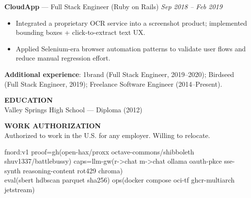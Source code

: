 \documentclass[10pt]{article}
\begin{document}
\textbf{CloudApp} --- Full Stack Engineer (Ruby on Rails) \hfill \textit{Sep 2018 -- Feb 2019}\\
\vspace{-6pt}
\begin{itemize}
  \setlength\itemsep{-2pt}
  \setlength\parskip{0pt}
  \setlength\parsep{0pt}
  \item Integrated a proprietary OCR service into a screenshot product; implemented bounding boxes + click-to-extract text UX.
  \item Applied Selenium-era browser automation patterns to validate user flows and reduce manual regression effort.
\end{itemize}

\textbf{Additional experience}: 1brand (Full Stack Engineer, 2019--2020); Birdseed (Full Stack Engineer, 2019); Freelance Software Engineer (2014--Present).

\vspace{6pt}
\textbf{EDUCATION}\\
Valley Springs High School --- Diploma (2012)

\vspace{2pt}
\textbf{WORK AUTHORIZATION}\\
Authorized to work in the U.S. for any employer. Willing to relocate.

\vspace{4pt}
{\scriptsize\ttfamily
fnord:v1\; proof=gh(open-hax/proxx octave-commons/shibboleth shuv1337/battlebussy)\; caps=llm-gw(r->chat m->chat ollama oauth-pkce sse-synth reasoning-content rot429 chroma)\\
eval(sbert hdbscan parquet sha256)\; ops(docker compose oci-tf ghcr-multiarch jetstream)
}
\end{document}

